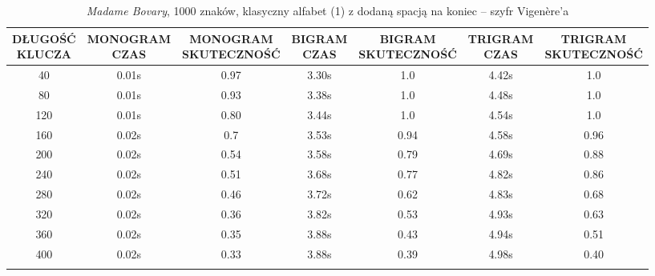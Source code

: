\documentclass[a4paper]{article}
\theoremstyle{defn}
\theoremstyle{theorem}
\theoremstyle{lemma}
\theoremstyle{cor}
\theoremstyle{fact}
\begin{document}
\begin{center}\begin{small}\begin{longtable}{|c|c|c|c|c|c|c|}
\hline \makecell{DŁUGOŚĆ\\KLUCZA} &  \makecell{MONOGRAM\\CZAS} & \makecell{MONOGRAM\\SKUTECZNOŚĆ} & \makecell{BIGRAM\\CZAS} &  \makecell{BIGRAM\\SKUTECZNOŚĆ} & \makecell{TRIGRAM\\CZAS} & \makecell{TRIGRAM\\SKUTECZNOŚĆ}\\ \hline
40 & 0.01s & 0.97 & 3.30s & 1.0 & 4.42s & 1.0 \\ \hline
80 & 0.01s & 0.93 & 3.38s & 1.0 & 4.48s & 1.0 \\ \hline
120 & 0.01s & 0.80 & 3.44s & 1.0 & 4.54s & 1.0 \\ \hline
160 & 0.02s & 0.7 & 3.53s & 0.94 & 4.58s & 0.96 \\ \hline
200 & 0.02s & 0.54 & 3.58s & 0.79 & 4.69s & 0.88 \\ \hline
240 & 0.02s & 0.51 & 3.68s & 0.77 & 4.82s & 0.86 \\ \hline
280 & 0.02s & 0.46 & 3.72s & 0.62 & 4.83s & 0.68 \\ \hline
320 & 0.02s & 0.36 & 3.82s & 0.53 & 4.93s & 0.63 \\ \hline
360 & 0.02s & 0.35 & 3.88s & 0.43 & 4.94s & 0.51 \\ \hline
400 & 0.02s & 0.33 & 3.88s & 0.39 & 4.98s & 0.40 \\ \hline
\caption{\textit{Madame Bovary}, 1000 znaków, klasyczny alfabet (1) z dodaną spacją na koniec – szyfr Vigenère'a}
\end{longtable}\end{small}\end{center}
\end{document}

